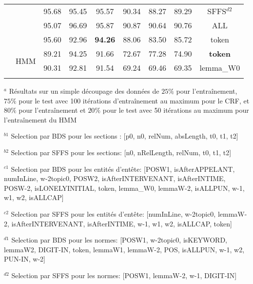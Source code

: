\begin{table}[!h]
\begin{center}
\begin{tabular}{l|c|ccc|ccc|c}
				&  & 95.68 & 95.45 & 95.57 & 90.34 & 88.27 & 89.29 & SFFS$^{d2}$ \\ 
                &  & 95.07 & 96.69 & 95.87 & 90.87 & 90.64 & 90.76 & ALL \\
                &  & 95.60 & 92.96 & \textbf{94.26} & 88.06 & 83.50 & 85.72 & token \\ \cline{2-9}
                 &  \multirow{2}{*}{HMM} & 89.21 & 94.25 & 91.66 & 72.67 & 77.28 & 74.90 &  \textbf{token} \\ 
  &   & 90.31 & 92.81 & 91.54 & 69.24 & 69.46 & 69.35 &  lemma\_W0 \\ 
\noalign{\smallskip}\hline\noalign{\smallskip}
\end{tabular}
\end{center}

$^a$ Résultats sur un simple découpage des données de $25\%$ pour l'entraînement,  $75\%$ pour le test avec 100 itérations d'entraînement au maximum  pour le CRF, et $80\%$ pour l'entraînement et $20\%$ pour le test avec 50 itérations au maximum pour l'entraînement du HMM

$^{b1}$ Selection par BDS pour les sections : [p0, n0, relNum, absLength, t0, t1, t2]

$^{b2}$ Selection par SFFS pour les sections: [n0, nRelLength, relNum, t0, t1, t2]

 $^{c1}$ Selection par BDS pour les entités d'entête:  [POSW1, isAfterAPPELANT, numInLine, w-2topic0, POSW2, isAfterINTERVENANT, isAfterINTIME, POSW-2, isLONELYINITIAL, token, lemma\_W0, lemmaW-2, isALLPUN, w-1, w1, w2, isALLCAP]

$^{c2}$ Selection par SFFS pour les  entités d'entête: [numInLine, w-2topic0, lemmaW-2, isAfterINTERVENANT, isAfterINTIME, w-1, w1, w2, isALLCAP, token]

$^{d1}$ Selection par BDS pour les normes: [POSW1, w-2topic0, isKEYWORD, lemmaW2, DIGIT-IN, token, lemmaW1, lemmaW-2, POS, isALLPUN, w-1, w2, PUN-IN, w-2]

$^{d2}$ Selection par SFFS pour les normes: [POSW1, lemmaW-2, w-1, DIGIT-IN]
\end{table}

